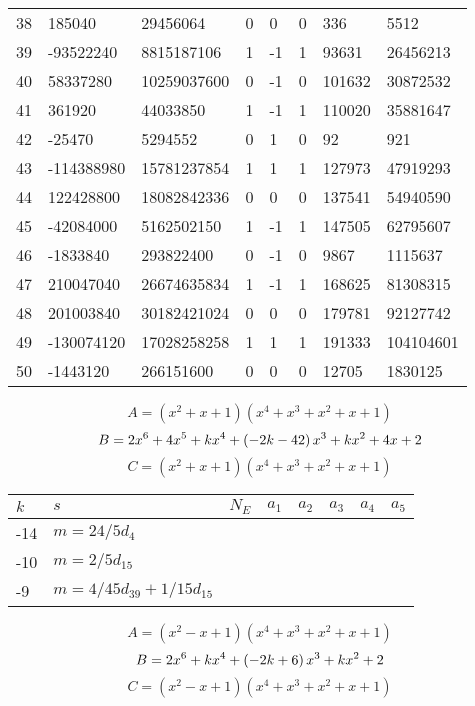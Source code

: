 \documentclass{amsart}
\begin{document}
\begin{longtable}{|l|l|l|lllll|}
38&185040&29456064&0&0&0&336&5512\\
39&-93522240&8815187106&1&-1&1&93631&26456213\\
40&58337280&10259037600&0&-1&0&101632&30872532\\
41&361920&44033850&1&-1&1&110020&35881647\\
42&-25470&5294552&0&1&0&92&921\\
43&-114388980&15781237854&1&1&1&127973&47919293\\
44&122428800&18082842336&0&0&0&137541&54940590\\
45&-42084000&5162502150&1&-1&1&147505&62795607\\
46&-1833840&293822400&0&-1&0&9867&1115637\\
47&210047040&26674635834&1&-1&1&168625&81308315\\
48&201003840&30182421024&0&0&0&179781&92127742\\
49&-130074120&17028258258&1&1&1&191333&104104601\\
50&-1443120&266151600&0&0&0&12705&1830125\\
\hline
\end{longtable}
$$A=(x^2
 + x
 + 1)(x^4
 + x^3
 + x^2
 + x
 + 1)$$
$$B=2\*x^6
 + 4\*x^5
 + k\*x^4
 + \left(-2\*k
 - 42\right) \*x^3
 + k\*x^2
 + 4\*x
 + 2$$
$$C=(x^2
 + x
 + 1)(x^4
 + x^3
 + x^2
 + x
 + 1)$$
\begin{longtable}{|l|l|l|lllll|}
\hline
$k$ & $s$ & $N_E$ & $a_1$ & $a_2$ & $a_3$ & $a_4$ & $a_5$\\
\hline
-14&$m=24/5d_{4}$&&\multicolumn{5}{c|}{}\\
-10&$m=2/5d_{15}$&&\multicolumn{5}{c|}{}\\
-9&$m=4/45d_{39}+1/15d_{15}$&&\multicolumn{5}{c|}{}\\
\hline
\end{longtable}
$$A=(x^2
 - x
 + 1)(x^4
 + x^3
 + x^2
 + x
 + 1)$$
$$B=2\*x^6
 + k\*x^4
 + \left(-2\*k
 + 6\right) \*x^3
 + k\*x^2
 + 2$$
$$C=(x^2
 - x
 + 1)(x^4
 + x^3
 + x^2
 + x
 + 1)$$
\end{document}
